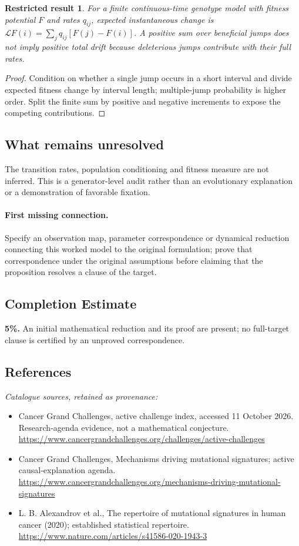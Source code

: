 \documentclass[11pt]{article}
\newtheorem{attemptresult}{Restricted result}[section]
\begin{document}
\begin{attemptresult}
For a finite continuous-time genotype model with fitness potential $F$ and rates $q_{ij}$, expected instantaneous change is $\mathcal LF(i)=\sum_jq_{ij}[F(j)-F(i)]$. A positive sum over beneficial jumps does not imply positive total drift because deleterious jumps contribute with their full rates.
\end{attemptresult}
\begin{proof}
Condition on whether a single jump occurs in a short interval and divide expected fitness change by interval length; multiple-jump probability is higher order. Split the finite sum by positive and negative increments to expose the competing contributions.
\end{proof}
\subsection{What remains unresolved}
The transition rates, population conditioning and fitness measure are not inferred. This is a generator-level audit rather than an evolutionary explanation or a demonstration of favorable fixation.
\paragraph{First missing connection.} Specify an observation map, parameter correspondence or dynamical reduction connecting this worked model to the original formulation; prove that correspondence under the original assumptions before claiming that the proposition resolves a clause of the target.
\subsection{Completion Estimate}
\textbf{5\%.} An initial mathematical reduction and its proof are present; no full-target clause is certified by an unproved correspondence.
\subsection{References}
\noindent\emph{Catalogue sources, retained as provenance:}
\begin{itemize}
\item Cancer Grand Challenges, active challenge index, accessed 11 October 2026. Research-agenda evidence, not a mathematical conjecture. \url{https://www.cancergrandchallenges.org/challenges/active-challenges}
\item Cancer Grand Challenges, Mechanisms driving mutational signatures; active causal-explanation agenda. \url{https://www.cancergrandchallenges.org/mechanisms-driving-mutational-signatures}
\item L. B. Alexandrov et al., The repertoire of mutational signatures in human cancer (2020); established statistical repertoire. \url{https://www.nature.com/articles/s41586-020-1943-3}
\end{itemize}
\clearpage
\end{document}
